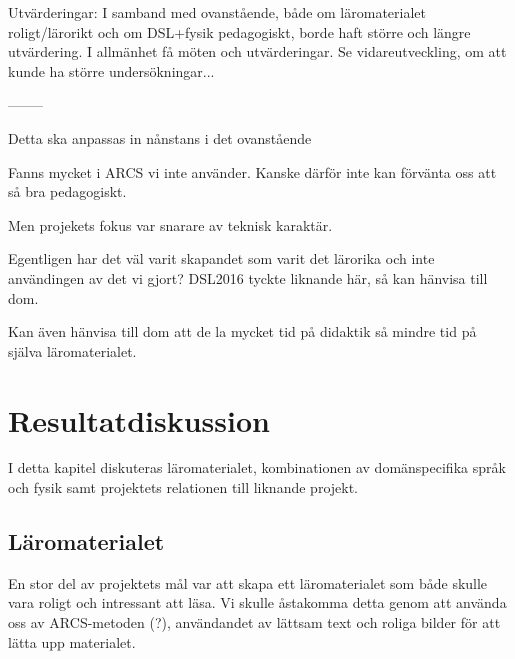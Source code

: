\begin{binge}
Utvärderingar: I samband med ovanstående, både om läromaterialet roligt/lärorikt
och om DSL+fysik pedagogiskt, borde haft större och längre utvärdering. I
allmänhet få möten och utvärderingar. Se vidareutveckling, om att kunde ha
större undersökningar...

--------

Detta ska anpassas in nånstans i det ovanstående

Fanns mycket i ARCS vi inte använder. Kanske därför inte kan förvänta oss att så
bra pedagogiskt.

Men projekets fokus var snarare av teknisk karaktär.

Egentligen har det väl varit skapandet som varit det lärorika och inte
användingen av det vi gjort? DSL2016 tyckte liknande här, så kan hänvisa till
dom.

Kan även hänvisa till dom att de la mycket tid på didaktik så mindre tid på
själva läromaterialet.

\section{Resultatdiskussion}

I detta kapitel diskuteras läromaterialet, kombinationen av domänspecifika språk
och fysik samt projektets relationen till liknande projekt.

\subsection{Läromaterialet}

En stor del av projektets mål var att skapa ett läromaterialet som både skulle
vara roligt och intressant att läsa. Vi skulle åstakomma detta genom att använda
oss av ARCS-metoden (?), användandet av lättsam text och roliga bilder för att
lätta upp materialet. 

\end{binge}
